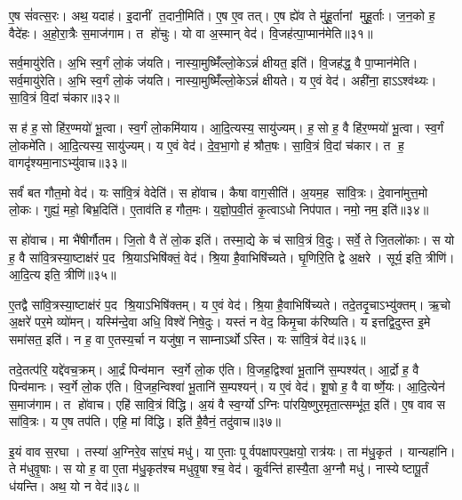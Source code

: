    ए॒ष सं॑वत्स॒रः।
   अथ॒ यदाह॑।
   इ॒दानीं त॒दानी॒मिति॑।
   ए॒ष ए॒व तत्।
   ए॒ष ह्ये॑व ते मु॑हू॒र्तानां मुहू॒र्ताः।
    ज॒न॒को ह॒ वैदे॑हः।
   अ॒हो॒रा॒त्रैः स॒माज॑गाम।
   त हो॑चुः।
   यो वा अ॒स्मान् वेद॑।
   वि॒जह॑त्पा॒प्मान॑मेति॥३१॥

   सर्व॒मायु॑रेति।
   अ॒भि स्व॒र्गं लो॒कं ज॑यति।
   नास्या॒मुष्मिँ॑ल्लो॒के\-ऽन्नं॑ क्षीयत॒ इति॑।
   वि॒जह॑द्ध॒ वै पा॒प्मान॑मेति।
   सर्व॒मायु॑रेति।
   अ॒भि स्व॒र्गं लो॒कं ज॑यति।
   नास्या॒मुष्मिँ॑ल्लो॒केऽन्नं॑ क्षीयते।
   य ए॒वं वेद॑।
   अही॑ना॒ हाऽऽश्व॑थ्यः।
   सा॒वि॒त्रं वि॒दां च॑कार॥३२॥

   स ह॑ ह॒सो हि॑र॒ण्मयो॑ भू॒त्वा।
   स्व॒र्गं लो॒कमि॑याय।
   आ॒दि॒त्यस्य॒ सायु॑ज्यम्।
   ह॒सो ह॒ वै हि॑र॒ण्मयो॑ भू॒त्वा।
   स्व॒र्गं लो॒कमे॑ति।
   आ॒दि॒त्यस्य॒ सायु॑ज्यम्।
   य ए॒वं वेद॑।
   दे॒व॒भा॒गो ह॑ श्रौत॒षः।
   सा॒वि॒त्रं वि॒दां च॑कार।
   त ह॒ वागदृ॑श्यमा॒नाऽभ्यु॑वाच॥३३॥

   सर्वं॑ बत गौत॒मो वेद॑।
   यः सा॑वि॒त्रं वेदेति॑।
   स हो॑वाच।
   कैषा वाग॒सीति॑।
   अ॒यम॒ह सा॑वि॒त्रः।
   दे॒वाना॑मुत्त॒मो लो॒कः।
   गुह्यं॒ महो॒ बिभ्र॒दिति॑।
   ए॒ताव॑ति ह गौत॒मः।
   य॒ज्ञो॒प॒वी॒तं कृ॒त्वाऽधो निप॑पात।
   नमो॒ नम॒ इति॑॥३४॥

   स हो॑वाच।
   मा भै॑षीर्गौतम।
   जि॒तो वै ते॑ लो॒क इति॑।
   तस्मा॒द्ये के च॑ सावि॒त्रं वि॒दुः।
   सर्वे॒ ते जि॒तलो॑काः।
   स यो ह॒ वै सा॑वि॒त्रस्या॒ष्टाक्ष॑रं प॒द श्रि॒याऽभिषि॑क्तं॒ वेद॑।
   श्रि॒या है॒वाभिषि॑च्यते।
   घृ॒णिरि॒ति द्वे अ॒क्षरे।
   सूर्य॒ इति॒ त्रीणि॑।
   आ॒दि॒त्य इति॒ त्रीणि॑॥३५॥

   ए॒तद्वै सा॑वि॒त्रस्या॒ष्टाक्ष॑रं प॒द श्रि॒याऽभिषि॑क्तम्।
   य ए॒वं वेद॑।
   श्रि॒या है॒वाभिषि॑च्यते।
   तदे॒तदृ॒चाऽभ्यु॑क्तम्।
   ऋ॒चो अ॒क्षरे॑ पर॒मे व्यो॑मन्।
   यस्मि॑न्दे॒वा अधि॒ विश्वे॑ निषे॒दुः।
   यस्तं न वेद॒ किमृ॒चा क॑रिष्यति।
   य इत्तद्वि॒दुस्त इ॒मे समा॑सत॒ इति॑।
   न ह॒ वा ए॒तस्य॒र्चा न यजु॑षा॒ न साम्नाऽर्थोऽस्ति।
   यः सा॑वि॒त्रं वेद॑॥३६॥

   तदे॒तत्प॑रि॒ यद्दे॑वच॒क्रम्।
   आ॒र्द्रं पिन्व॑मान स्व॒र्गे लो॒क ए॑ति।
   वि॒जह॒द्विश्वा॑ भू॒तानि॑ स॒म्पश्य॑त्।
   आ॒र्द्रो ह॒ वै पिन्व॑मानः।
   स्व॒र्गे लो॒क ए॑ति।
   वि॒जह॒न्विश्वा॑ भू॒तानि॑ स॒म्पश्यन्॑।
   य ए॒वं वेद॑।
   शू॒षो ह॒ वै वार्ष्णे॒यः।
   आ॒दि॒त्येन॑ स॒माज॑गाम।
   त हो॑वाच।
   एहि॑ सावि॒त्रं वि॑द्धि।
   अ॒यं वै स्व॒र्ग्योऽग्निः पा॑रयि॒ष्णुर॒मृता॒त्सम्भू॑त॒ इति॑।
   ए॒ष वाव स सा॑वि॒त्रः।
   य ए॒ष तप॑ति।
   एहि॒ मां वि॑द्धि।
   इति॑ है॒वैनं॒ तदु॑वाच॥३७॥
   \anuvakamend

   इ॒यं वाव स॒रघा।
   तस्या॑ अ॒ग्निरे॒व सा॑र॒घं मधु॑।
   या ए॒ताः पूर्वपक्षापरप॒क्षयो॒ रात्र॑यः।
   ता म॑धु॒कृत॑।
   यान्यहा॑नि।
   ते म॑धुवृ॒षाः।
   स यो ह॒ वा ए॒ता म॑धु॒कृत॑श्च मधुवृ॒षाश्च॒ वेद॑।
   कु॒र्वन्ति॑ हास्यै॒ता अ॒ग्नौ मधु॑।
   नास्येष्टापू॒र्तं ध॑यन्ति।
   अथ॒ यो न वेद॑॥३८॥

